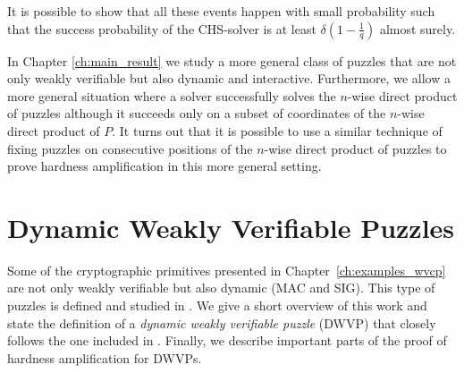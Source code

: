 It is possible to show that all these events happen with small probability such that
the success probability of the CHS-solver is at least $\delta(1\!-\!\frac{1}{q})$ almost surely.

In Chapter \ref{ch:main_result} we study a more general class of puzzles that are not only weakly verifiable but also dynamic and interactive.
Furthermore, we allow a more general situation where a solver successfully solves the $n$-wise direct product of puzzles
although it succeeds only on a subset of coordinates of the $n$-wise direct product of $P$.
It turns out that it is possible to use a similar technique of fixing puzzles on consecutive positions of the $n$-wise direct product of
puzzles to prove hardness amplification in this more general setting.
%
\section{Dynamic Weakly Verifiable Puzzles}
\label{section:dijk}
Some of the cryptographic primitives presented in Chapter~\ref{ch:examples_wvcp}
are not only weakly verifiable but also dynamic (MAC and SIG). This type of puzzles is defined and studied in \cite{Dodis:2009:SAI:1530441.1530450}.
We give a short overview of this work and state the definition of a \textit{dynamic weakly verifiable puzzle} (DWVP) that closely follows
the one included in \cite{Dodis:2009:SAI:1530441.1530450}.
Finally, we describe important parts of the proof of hardness amplification for DWVPs.

